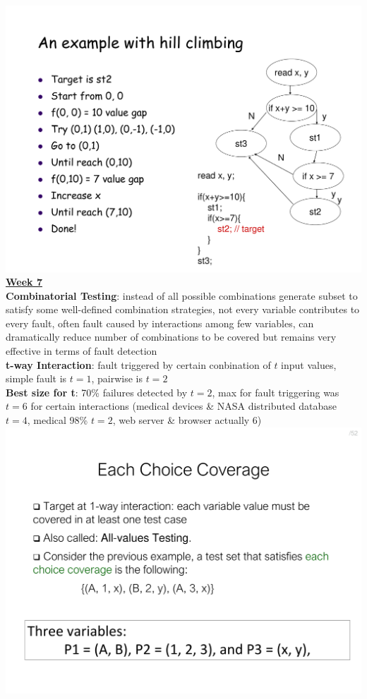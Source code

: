 \documentclass[a4paper]{article}
\begin{document}
\begin{multicols}{3}
        \includegraphics[width=\linewidth]{293.pdf}\\
        \underline{\textbf{Week 7}}\\
        \textbf{Combinatorial Testing}: instead of all possible combinations generate subset to satisfy some well-defined combination strategies, not every variable contributes to every fault, often fault caused by interactions among few variables, can dramatically reduce number of combinations to be covered but remains very effective in terms of fault detection\\
        \textbf{t-way Interaction}: fault triggered by certain conbination of $t$ input values, simple fault is $t=1$, pairwise is $t=2$\\
        \textbf{Best size for t}: 70\% failures detected by $t=2$, max for fault triggering was $t=6$ for certain interactions (medical devices \& NASA distributed database $t=4$, medical 98\% $t=2$, web server \& browser actually 6)\\
        \includegraphics[width=\linewidth]{304.pdf}\\

\end{multicols}
\end{document}
